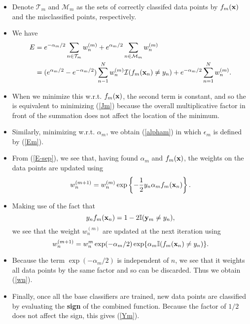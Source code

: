 \documentclass{beamer}
\def\bfx{{\bf x}}
\def\bfy{{\bf y}}
\begin{document}
                     \begin{frame}{}
                     \begin{itemize}\small
                      \item Denote $\mathcal{T}_m$ and $\mathcal{M}_m$ as the sets of correctly classifed data points by $f_m(\bfx)$ and the misclassified points, respectively.
                      \item We have
                      \begin{align}
                      E&=e^{-\alpha_m/2}\sum_{n\in \mathcal{T}_m}w_n^{(m)} + e^{\alpha_m/2}\sum_{n\in \mathcal{M}_m} w_n^{(m)}\nonumber\\
                      &=(e^{\alpha_m/2} - e^{-\alpha_m/2})\sum^N_{n-1}w_n^{(m)}\mathcal{I}(f_m(\bfx_n)\ne y_n) + e^{-\alpha_m/2}\sum^N_{n=1}w_n^{(m)}.
                      \end{align}
                      \item When we minimize this w.r.t. $f_m(\bfx)$, the second term is constant, and so the is equivalent to minimizing (\ref{Jm}) because the overall multiplicative factor in front of the summation does not affect the location of the minimum.
                      \item Similarly, minimizing w.r.t. $\alpha_m$, we obtain (\ref{alpham}) in which $\epsilon_m$ is defined by (\ref{Em}).
                     \end{itemize}
                     \end{frame}

                     \begin{frame}{}
                     \begin{itemize}
                     \item From (\ref{E-sep}), we see that, having found $\alpha_m$ and $f_m(\bfx)$, the weights on the data points are updated using
                     $$w_n^{(m+1)} = w_n^{(m)}\exp\left\{-\frac{1}{2} y_n \alpha_m f_m(\bfx_n)\right\}.$$
                     \item Making use of the fact that
                     $$y_n f_m(\bfx_n) = 1-2\mathbb{I}(\bfy_m \ne y_n),$$
                     we see that the weight $w_n^{(m)}$ are updated at the next iteration using
                     $$w_n^{(m+1)} = w_n^{m}\exp(-\alpha_m/2)\exp \{\alpha_m \mathbb{I}(f_m(\bfx_n) \ne y_n)\}.$$
                     \item Because the term $\exp(-\alpha_m/2)$ is independent of $n$, we see that it weights all data points by the same factor and so can be discarded. Thus we obtain (\ref{wn}).
                     \item Finally, once all the base classifiers are trained, new data points are classified by evaluating the \textbf{sign} of the combined function. Because the factor of $1/2$ does not affect the sign, this gives (\ref{Ym}). 
                     \end{itemize}
                     \end{frame}
\end{document}
